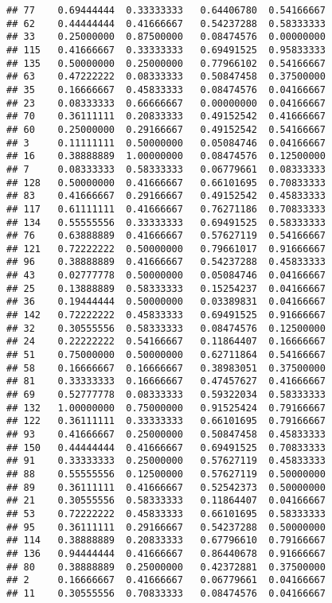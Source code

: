 \documentclass[
]{article}
\begin{document}
\begin{verbatim}
## 77    0.69444444  0.33333333   0.64406780  0.54166667
## 62    0.44444444  0.41666667   0.54237288  0.58333333
## 33    0.25000000  0.87500000   0.08474576  0.00000000
## 115   0.41666667  0.33333333   0.69491525  0.95833333
## 135   0.50000000  0.25000000   0.77966102  0.54166667
## 63    0.47222222  0.08333333   0.50847458  0.37500000
## 35    0.16666667  0.45833333   0.08474576  0.04166667
## 23    0.08333333  0.66666667   0.00000000  0.04166667
## 70    0.36111111  0.20833333   0.49152542  0.41666667
## 60    0.25000000  0.29166667   0.49152542  0.54166667
## 3     0.11111111  0.50000000   0.05084746  0.04166667
## 16    0.38888889  1.00000000   0.08474576  0.12500000
## 7     0.08333333  0.58333333   0.06779661  0.08333333
## 128   0.50000000  0.41666667   0.66101695  0.70833333
## 83    0.41666667  0.29166667   0.49152542  0.45833333
## 117   0.61111111  0.41666667   0.76271186  0.70833333
## 134   0.55555556  0.33333333   0.69491525  0.58333333
## 76    0.63888889  0.41666667   0.57627119  0.54166667
## 121   0.72222222  0.50000000   0.79661017  0.91666667
## 96    0.38888889  0.41666667   0.54237288  0.45833333
## 43    0.02777778  0.50000000   0.05084746  0.04166667
## 25    0.13888889  0.58333333   0.15254237  0.04166667
## 36    0.19444444  0.50000000   0.03389831  0.04166667
## 142   0.72222222  0.45833333   0.69491525  0.91666667
## 32    0.30555556  0.58333333   0.08474576  0.12500000
## 24    0.22222222  0.54166667   0.11864407  0.16666667
## 51    0.75000000  0.50000000   0.62711864  0.54166667
## 58    0.16666667  0.16666667   0.38983051  0.37500000
## 81    0.33333333  0.16666667   0.47457627  0.41666667
## 69    0.52777778  0.08333333   0.59322034  0.58333333
## 132   1.00000000  0.75000000   0.91525424  0.79166667
## 122   0.36111111  0.33333333   0.66101695  0.79166667
## 93    0.41666667  0.25000000   0.50847458  0.45833333
## 150   0.44444444  0.41666667   0.69491525  0.70833333
## 91    0.33333333  0.25000000   0.57627119  0.45833333
## 88    0.55555556  0.12500000   0.57627119  0.50000000
## 89    0.36111111  0.41666667   0.52542373  0.50000000
## 21    0.30555556  0.58333333   0.11864407  0.04166667
## 53    0.72222222  0.45833333   0.66101695  0.58333333
## 95    0.36111111  0.29166667   0.54237288  0.50000000
## 114   0.38888889  0.20833333   0.67796610  0.79166667
## 136   0.94444444  0.41666667   0.86440678  0.91666667
## 80    0.38888889  0.25000000   0.42372881  0.37500000
## 2     0.16666667  0.41666667   0.06779661  0.04166667
## 11    0.30555556  0.70833333   0.08474576  0.04166667
\end{verbatim}
\end{document}
